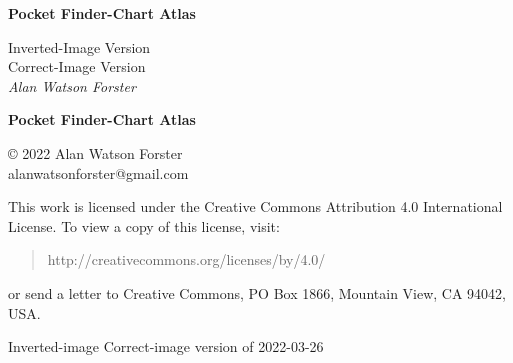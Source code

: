 
\pagestyle{empty}


\begin{center}
\vspace*{1cm}

\begingroup
\Huge\bfseries Pocket Finder-Chart Atlas\endgroup

\vspace{0.5cm}

\vspace{0.5cm}

\begingroup
\ifinverted
\large Inverted-Image Version\\[\bigskipamount]
\else
\large Correct-Image Version\\[\bigskipamount]
\fi
\large{\itshape Alan Watson Forster}
\endgroup

\end{center}


\cleardoublepage


\setcounter{page}{1}

\null\vfill

\begin{center}

\begingroup
\huge\bfseries Pocket Finder-Chart Atlas
\endgroup

\end{center}

\vfill

\clearpage


\null\vfill

\begin{raggedright}
\small

© 2022 Alan Watson Forster\\
alanwatsonforster@gmail.com

\medskip

This work is licensed under the Creative Commons Attribution 4.0 International License. To view a copy of this license, visit:
\begin{quote}
 http://creativecommons.org/licenses/by/4.0/ 
\end{quote}
or send a letter to Creative Commons, PO Box 1866, Mountain View, CA 94042, USA.

\medskip


\ifinverted
Inverted-image
\else
Correct-image
\fi
version of 2022-03-26

\end{raggedright}

\cleardoublepage


\pagestyle{plain}

\tableofcontents
